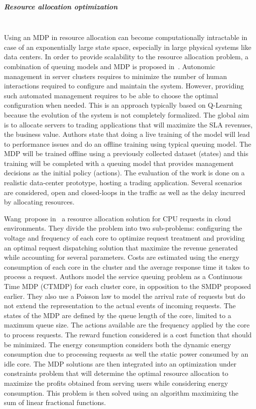 \subparagraph{Resource allocation optimization}
\textbf{\\}
Using an MDP in resource allocation can become computationally intractable in case of an exponentially large state space, especially in large physical systems like data centers. In order to provide scalability to the resource allocation problem, a combination of queuing models and MDP is proposed in~\cite{Tesauro2006}.
Autonomic management in server clusters requires to minimize the number of human interactions required to configure and maintain the system.
However, providing such automated management requires to be able to choose the optimal configuration when needed.
This is an approach typically based on Q-Learning because the evolution of the system is not completely formalized.
The global aim is to allocate servers to trading applications that will maximize the SLA revenues, \ie the business value.
Authors state that doing a live training of the model will lead to performance issues and do an offline training using typical queuing model. The MDP will be trained offline using a previously collected dataset (states) and this training will be completed with a queuing model that provides management decisions as the initial policy (actions).
The evaluation of the work is done on a realistic data-center prototype, hosting a trading application. 
Several scenarios are considered, open and closed-loops in the traffic as well as the delay incurred by allocating resources.

Wang~\etal propose in~\cite{Wang2013} a resource allocation solution for CPU requests in cloud environments.
They divide the problem into two sub-problems: configuring the voltage and frequency of each core to optimize request treatment and providing an optimal request dispatching solution that maximize the revenue generated while accounting for several parameters.
Costs are estimated using the energy consumption of each core in the cluster and the average response time it takes to process a request.
Authors model the service queuing problem as a Continuous Time MDP (CTMDP) for each cluster core, in opposition to the SMDP proposed earlier.
They also use a Poisson law to model the arrival rate of requests but do not extend the representation to the actual events of incoming requests.
The states of the MDP are defined by the queue length of the core, limited to a maximum queue size. The actions available are the frequency applied by the core to process requests.
The reward function considered is a cost function that should be minimized.
The energy consumption considers both the dynamic energy consumption due to processing requests as well the static power consumed by an idle core.
The MDP solutions are then integrated into an optimization under constraints problem that will determine the optimal resource allocation to maximize the profits obtained from serving users while considering energy consumption.
This problem is then solved using an algorithm maximizing the sum of linear fractional functions.


